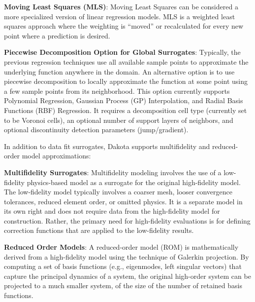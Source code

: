 \textbf{Moving Least Squares (MLS)}: Moving Least Squares can be 
considered a more specialized version of linear regression models.
MLS is a weighted least squares approach where the weighting is 
``moved'' or recalculated for every new point where 
a prediction is desired.~\cite{Nea04} 

\textbf{Piecewise Decomposition Option for Global Surrogates}: Typically, the previous regression techniques use all available sample points to approximate the underlying function anywhere in the domain. An alternative option is to use piecewise decomposition to locally approximate the function at some point using a few sample points from its neighborhood. This option currently supports Polynomial Regression, Gaussian Process (GP) Interpolation, and Radial Basis Functions (RBF) Regression. It requires a decomposition cell type (currently set to be Voronoi cells), an optional number of support layers of neighbors, and optional discontinuity detection parameters (jump/gradient).   


In addition to data fit surrogates, Dakota supports multifidelity 
and reduced-order model approximations:

\textbf{Multifidelity Surrogates}: Multifidelity modeling involves the
use of a low-fidelity physics-based model as a surrogate for the
original high-fidelity model.  The low-fidelity model typically
involves a coarser mesh, looser convergence tolerances, reduced
element order, or omitted physics.  It is a separate model in its own
right and does not require data from the high-fidelity model for
construction.  Rather, the primary need for high-fidelity evaluations
is for defining correction functions that are applied to the
low-fidelity results.

\textbf{Reduced Order Models}: A reduced-order model (ROM) is
mathematically derived from a high-fidelity model using the technique
of Galerkin projection.  By computing a set of basis functions (e.g.,
eigenmodes, left singular vectors) that capture the principal dynamics
of a system, the original high-order system can be projected to a much
smaller system, of the size of the number of retained basis functions.

